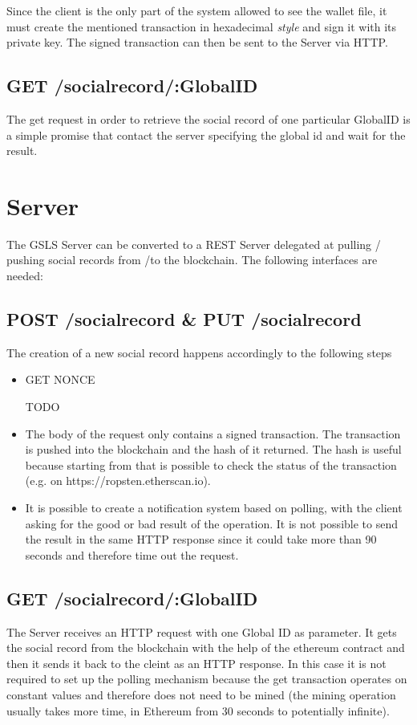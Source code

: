 Since the client is the only part of the system allowed to see the wallet file, it must create the mentioned transaction in hexadecimal \textit{style} and sign it with its private key.
The signed transaction can then be sent to the Server via HTTP.

\subsection{GET /socialrecord/:GlobalID}
The get request in order to retrieve the social record of one particular GlobalID is a simple promise that contact the server specifying the global id and wait for the result.

\section{Server}
The GSLS Server can be converted to a REST Server delegated at pulling / pushing social records from /to the blockchain.
The following interfaces are needed:
\subsection{POST /socialrecord \& PUT /socialrecord}
  The creation of a new social record happens accordingly to the following steps
  \begin{itemize}
    \item GET NONCE \begin{notation}
      TODO
  \end{notation}
    \item The body of the request only contains a signed transaction. The transaction is pushed into the blockchain and the hash of it returned. The hash is useful because starting from that is possible to check the status of the transaction (e.g. on https://ropsten.etherscan.io).
    \item It is possible to create a notification system based on polling, with the client asking for the good or bad result of the operation. It is not possible to send the result in the same HTTP response since it could take more than 90 seconds and therefore time out the request.
  \end{itemize}
\subsection{GET /socialrecord/:GlobalID}
The Server receives an HTTP request with one Global ID as parameter. It gets the social record from the blockchain with the help of the ethereum contract and then it sends it back to the cleint as an HTTP response.
In this case it is not required to set up the polling mechanism because the get transaction operates on constant values and therefore does not need to be mined (the mining operation usually takes more time, in Ethereum from 30 seconds to potentially infinite).

